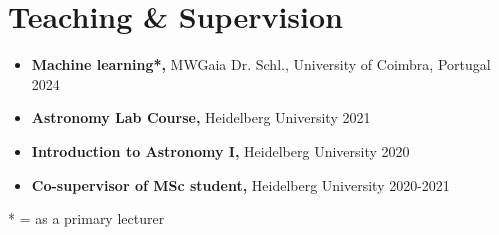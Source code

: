 \section*{Teaching \& Supervision}

\begin{itemize}
    \item \textbf{Machine learning*,} MWGaia Dr. Schl., University of Coimbra, Portugal \hfill 2024
    \item \textbf{Astronomy Lab Course,} Heidelberg University \hfill 2021
    \item \textbf{Introduction to Astronomy I,} Heidelberg University \hfill 2020
    \item \textbf{Co-supervisor of MSc student,} Heidelberg University \hfill 2020-2021
\end{itemize}

* = as a primary lecturer
